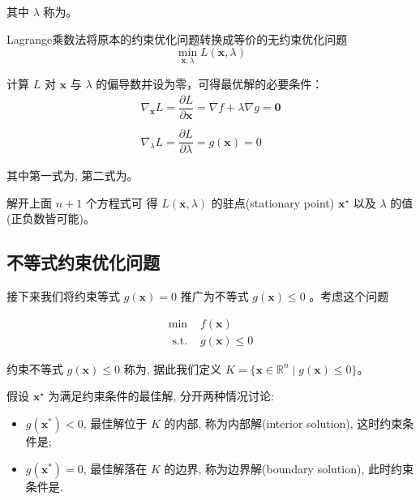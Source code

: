 其中 $ \lambda $ 称为。 

\begin{theorem}
    Lagrange乘数法将原本的约束优化问题转换成等价的无约束优化问题
$$
\min _{\mathbf{x}, \lambda} L(\mathbf{x}, \lambda)
$$
\end{theorem}

\begin{theorem}[拉格朗日乘子法最优解必要条件]
    计算 $ L $ 对 $ \mathbf{x} $ 与 $ \lambda $ 的偏导数并设为零，可得最优解的必要条件：
$$
\begin{array}{l}
\nabla_{\mathbf{x}} L=\dfrac{\partial L}{\partial \mathbf{x}}=\nabla f+\lambda \nabla g=\mathbf{0} \\
\\
\nabla_{\lambda} L=\dfrac{\partial L}{\partial \lambda}=g(\mathbf{x})=0
\end{array}
$$

其中第一式为, 第二式为。
\end{theorem}


解开上面 $ n+1 $ 个方程式可 得 $ L(\mathbf{x}, \lambda) $ 的驻点(stationary point) $ \mathbf{x}^{\star} $ 以及 $ \lambda $ 的值(正负数皆可能)。

\subsection{不等式约束优化问题}

接下来我们将约束等式 $ g(\mathbf{x})=0 $ 推广为不等式 $ g(\mathbf{x}) \leq 0 $ 。考虑这个问题

\begin{problem}[不等式约束优化问题]

$$
\begin{array}{ll}
\min & f(\mathbf{x}) \\
\text { s.t. } & g(\mathbf{x}) \leq 0
\end{array}
$$

约束不等式 $ g(\mathbf{x}) \leq 0 $ 称为, 据此我们定义 $ K=\{ \mathbf{x} \in \mathbb{R}^{n} \mid g(\mathbf{x}) \leq 0 \}$。
\end{problem}

假设 $ \mathbf{x}^{\star} $ 为满足约束条件的最佳解, 分开两种情况讨论:

\begin{itemize}
    \item $ g\left(\mathbf{x}^{*}\right)<0 $, 最佳解位于 $ K $ 的内部, 称为内部解(interior solution), 这时约束条件是;
    \item $ g\left(\mathbf{x}^{*}\right)=0 $, 最佳解落在 $ K $ 的边界, 称为边界解(boundary solution), 此时约束条件是.
\end{itemize}

